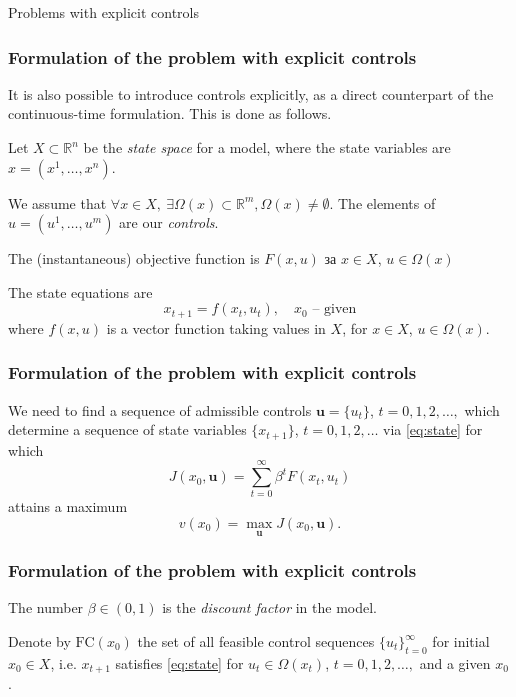 \documentclass[10pt]{beamer}
\theoremstyle{definition}
\begin{document}
\begin{section}{Problems with explicit controls}\label{sec:explcontr}

\begin{frame}[fragile]
\frametitle{Formulation of the problem with explicit controls}
It is also possible to introduce controls explicitly, as a direct counterpart of the continuous-time formulation. This is done as follows.\bigskip

Let $X \subset \mathbb{R}^n$ be the \emph{state space} for a model, where the state variables are $x=(x^1,\ldots,x^n)$. \bigskip

We assume that $\forall x \in X,~ \exists \Omega(x) \subset \mathbb{R}^m, \Omega(x)\neq \emptyset$. The elements of $u=(u^1,\ldots,u^m)$ are our \emph{controls}. \bigskip

The (instantaneous) objective function is $F(x,u)$ за $x \in X$, $u \in \Omega(x)$ \bigskip

The state equations are
\begin{equation}
x_{t+1}=f(x_t,u_t),\quad x_0 \text{ -- given} \label{eq:state}
\end{equation}
where $f(x,u)$ is a vector function taking values in $X$, for $x \in X$, $u \in \Omega(x)$.\bigskip
\end{frame}



\begin{frame}[fragile]
\frametitle{Formulation of the problem with explicit controls}

We need to find a sequence of admissible controls $\mathbf{u} = \{u_t\}$, $t=0,1,2,\ldots,$
which determine a sequence of state variables $\{ x_{t+1} \}$, $t=0,1,2,\ldots$ via \eqref{eq:state} for which \begin{equation}
J(x_0,\mathbf{u})=\sum_{t=0}^\infty
\beta^t F(x_t,u_t)\label{eq:obj}
\end{equation} attains a maximum \begin{equation}
v(x_0)=\max_{\mathbf{u}} J(x_0,\mathbf{u}).  
\label{eq:objMax}
\end{equation} 
\end{frame}



\begin{frame}[fragile]
\frametitle{Formulation of the problem with explicit controls}
The number $\beta \in (0,1)$ is the \emph{discount factor} in the model. \bigskip

Denote by $\textrm{FC}(x_0)$ the set of all feasible control sequences $\{ u_t\}_{t=0}^\infty$ for initial $x_0 \in X$, i.e. $ x_{t+1} $
satisfies \eqref{eq:state} for $ u_t \in \Omega(x_t)$, $t=0,1,2,\ldots,$
and a given $x_0$. \bigskip


\end{frame}
\end{section}
\end{document}

